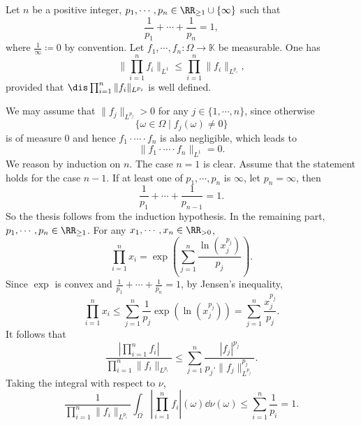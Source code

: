 \begin{theoremenv}
    Let $n$ be a positive integer, $p_1,\cdots,p_n \in \RR_{\ge 1} \cup \{\infty\}$ such that
    $$\frac{1}{p_1} + \cdots + \frac{1}{p_n} = 1,$$
    where $\frac{1}{\infty} \coloneq 0$ by convention.
    Let $f_1,\cdots,f_n : \Omega \longrightarrow \mathbb{K}$ be measurable.
    One has
    $$\|\prod_{i=1}^{n}f_i\|_{L^{1}} \le \prod_{i = 1}^n \|f_i\|_{L^{p_i}},$$
    provided that $\dis \prod_{i = 1}^n \|f_i\|_{L^{p_i}}$ is well defined.
\end{theoremenv}
\begin{proofenv}
    We may assume that $\|f_{j}\|_{L^{p_j}} > 0$ for any $j \in \{1,\cdots,n\}$, since otherwise
    $$\{\omega \in \Omega \mid f_{j} (\omega) \neq 0\}$$
    is of measure $0$ and hence $f_1 \cdot \cdots \cdot f_n$ is also negligible, which leads to
    $$\|f_1 \cdot \cdots \cdot f_n\|_{L^{1}} = 0.$$
    We reason by induction on $n$.
    The case $n=1$ is clear.
    Assume that the statement holds for the case $n-1$. If at least one of $p_1, \cdots, p_n$ is $\infty$, let $p_n = \infty$, then
    $$\frac{1}{p_1} + \cdots + \frac{1}{p_{n-1}} = 1.$$
    So the thesis follows from the induction hypothesis.
    In the remaining part, $p_1,\cdots,p_n \in \RR_{\ge 1}$.
    For any $x_1,\cdots,x_n \in \RR_{>0}$,
    $$\prod_{i = 1}^{n} x_i = \exp \left(\sum_{j = 1}^{n} \frac{\ln(x_j^{p_j})}{p_j}\right).$$
    Since $\exp$ is convex and $\frac{1}{p_1} + \cdots + \frac{1}{p_n} = 1$, by Jensen's inequality,
    $$\prod_{i = 1}^{n} x_i \le \sum_{j = 1}^{n} \frac{1}{p_j} \exp\left(\ln(x_j^{p_j})\right) = \sum_{j=1}^{n} \frac{x_j^{p_j}}{p_j}.$$
    It follows that
    $$\frac{|\prod_{i=1}^{n} f_i|}{\prod_{i=1}^{n}\|f_i\|_{L^{p_i}}} \le \sum_{j=1}^{n} \frac{|f_j|^{p_j}}{p_j \cdot \|f_j\|^{p_j}_{L^{p_j}}}.$$
    Taking the integral with respect to $\nu$,
    $$\frac{1}{\prod_{i=1}^{n} \|f_i\|_{L^{p_i}}} \int_{\Omega} |\prod_{i=1}^{n} f_i| (\omega) \dd \nu(\omega) \le \sum_{i=1}^{n}\frac{1}{p_i} = 1.$$
\end{proofenv}

